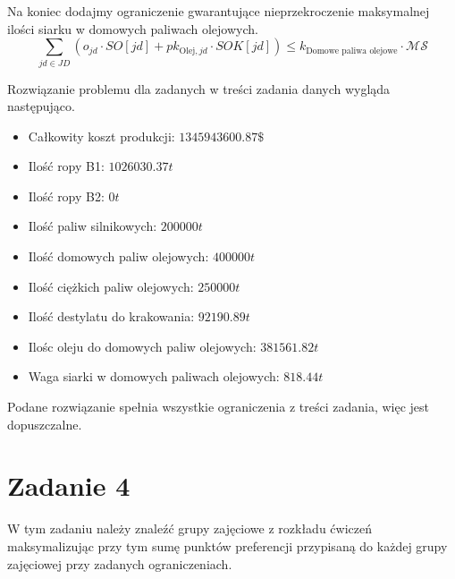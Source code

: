 \documentclass[12pt]{article}
\begin{document}
Na koniec dodajmy ograniczenie gwarantujące nieprzekroczenie maksymalnej ilości siarku w domowych paliwach olejowych.
\[ \sum_{jd \in JD} (o_{jd} \cdot SO[jd] + pk_{\text{Olej},jd} \cdot SOK[jd]) \leq k_{\text{Domowe paliwa olejowe}} \cdot \mathcal{MS} \]

Rozwiązanie problemu dla zadanych w treści zadania danych wygląda następująco.

\begin{itemize}
    \item Całkowity koszt produkcji: $1345943600.87\$$
    \item Ilość ropy B1: $1026030.37t$
    \item Ilość ropy B2: $0t$
    \item Ilość paliw silnikowych: $200000t$
    \item Ilość domowych paliw olejowych: $400000t$
    \item Ilość ciężkich paliw olejowych: $250000t$
    \item Ilość destylatu do krakowania: $92190.89t$
    \item Ilośc oleju do domowych paliw olejowych: $381561.82t$
    \item Waga siarki w domowych paliwach olejowych: $818.44t$
\end{itemize}

Podane rozwiązanie spełnia wszystkie ograniczenia z treści zadania, więc jest dopuszczalne.

\section*{Zadanie 4}

W tym zadaniu należy znaleźć grupy zajęciowe z rozkładu ćwiczeń maksymalizując przy tym sumę punktów preferencji przypisaną do każdej grupy zajęciowej przy zadanych ograniczeniach.
\end{document}
